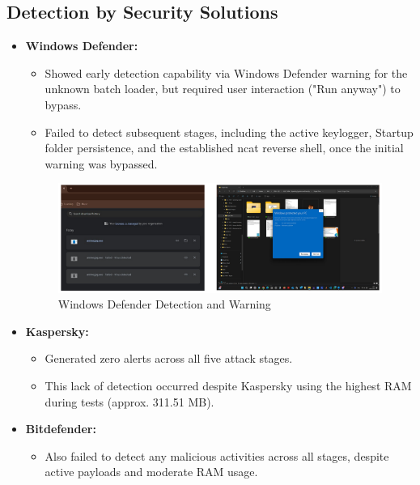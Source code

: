 \documentclass[11pt]{article}
\begin{document}
	\subsection{Detection by Security Solutions}
	\begin{itemize}
		\item \textbf{Windows Defender:}
		\begin{itemize}
			\item Showed early detection capability via Windows Defender warning for the unknown batch loader, but required user interaction ("Run anyway") to bypass.
			\item Failed to detect subsequent stages, including the active keylogger, Startup folder persistence, and the established ncat reverse shell, once the initial warning was bypassed.
		\end{itemize}
		\begin{figure}[H]
			\centering
			\includegraphics[width=\linewidth]{"Pictures/Final Pictures/warning"}
			\caption{Windows Defender Detection and Warning}
			\label{fig:warning}
		\end{figure}
		
		
		\item \textbf{Kaspersky:}
		\begin{itemize}
			\item Generated zero alerts across all five attack stages.
			\item This lack of detection occurred despite Kaspersky using the highest RAM during tests (approx. 311.51 MB).
		\end{itemize}
		\item \textbf{Bitdefender:}
		\begin{itemize}
			\item Also failed to detect any malicious activities across all stages, despite active payloads and moderate RAM usage.
		\end{itemize}
	\end{itemize}
	
\end{document}
